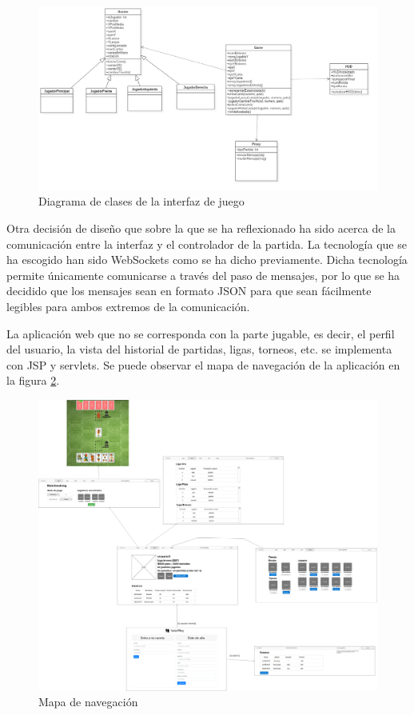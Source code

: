 \begin{figure}
  \includegraphics[width=\linewidth]{figuras/clasesInterfazJuego.png}
  \caption{Diagrama de clases de la interfaz de juego}
  \label{fig:clasesInterfazJuego}
\end{figure}

Otra decisión de diseño que sobre la que se ha reflexionado ha sido acerca de la comunicación entre la interfaz y el controlador de la partida. La tecnología que se ha escogido han sido WebSockets como se ha dicho previamente. Dicha tecnología permite únicamente comunicarse a través del paso de mensajes, por lo que se ha decidido que los mensajes sean en formato JSON para que sean fácilmente legibles para ambos extremos de la comunicación.

La aplicación web que no se corresponda con la parte jugable, es decir, el perfil del usuario, la vista del historial de partidas, ligas, torneos, etc. se implementa con JSP y servlets. Se puede observar el mapa de navegación de la aplicación en la figura \ref{fig:mapaDeNavegacion}.

\begin{figure}
  \includegraphics[width=\linewidth]{figuras/mapaNavegacion.png}
  \caption{Mapa de navegación}
  \label{fig:mapaDeNavegacion}
\end{figure}


